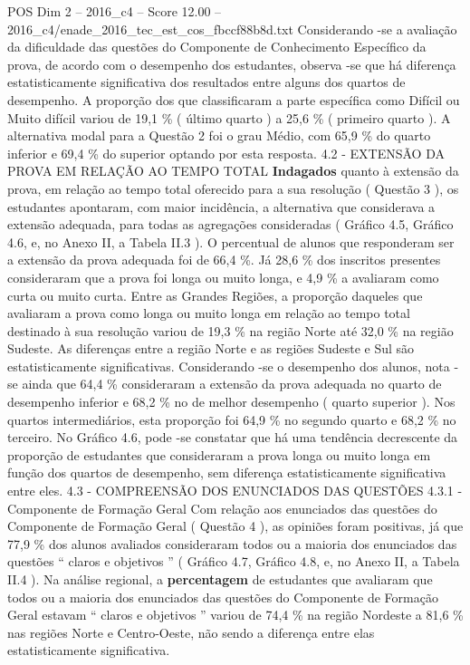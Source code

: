 \begin{textsample}{POS Dim 2 – 2016\_c4 – Score 12.00 – 2016\_c4/enade\_2016\_tec\_est\_cos\_fbccf88b8d.txt}
Considerando -se a avaliação da dificuldade das questões do Componente de Conhecimento Específico da prova, de acordo com o desempenho dos estudantes, observa -se que há diferença estatisticamente significativa dos resultados entre alguns dos quartos de desempenho.
A proporção dos que classificaram a parte específica como Difícil ou Muito difícil variou de 19,1 \% ( último quarto ) a 25,6 \% ( primeiro quarto ).
A alternativa modal para a Questão 2 foi o grau Médio, com 65,9 \% do quarto inferior e 69,4 \% do superior optando por esta resposta. 4.2 - EXTENSÃO DA PROVA EM RELAÇÃO AO TEMPO TOTAL \textbf{Indagados} quanto à extensão da prova, em relação ao tempo total oferecido para a sua resolução ( Questão 3 ), os estudantes apontaram, com maior incidência, a alternativa que considerava a extensão adequada, para todas as agregações consideradas ( Gráfico 4.5, Gráfico 4.6, e, no Anexo II, a Tabela II.3 ).
O percentual de alunos que responderam ser a extensão da prova adequada foi de 66,4 \%.
Já 28,6 \% dos inscritos presentes consideraram que a prova foi longa ou muito longa, e 4,9 \% a avaliaram como curta ou muito curta.
Entre as Grandes Regiões, a proporção daqueles que avaliaram a prova como longa ou muito longa em relação ao tempo total destinado à sua resolução variou de 19,3 \% na região Norte até 32,0 \% na região Sudeste.
As diferenças entre a região Norte e as regiões Sudeste e Sul são estatisticamente significativas.
Considerando -se o desempenho dos alunos, nota -se ainda que 64,4 \% consideraram a extensão da prova adequada no quarto de desempenho inferior e 68,2 \% no de melhor desempenho ( quarto superior ).
Nos quartos intermediários, esta proporção foi 64,9 \% no segundo quarto e 68,2 \% no terceiro.
No Gráfico 4.6, pode -se constatar que há uma tendência decrescente da proporção de estudantes que consideraram a prova longa ou muito longa em função dos quartos de desempenho, sem diferença estatisticamente significativa entre eles. 4.3 - COMPREENSÃO DOS ENUNCIADOS DAS QUESTÕES 4.3.1 - Componente de Formação Geral Com relação aos enunciados das questões do Componente de Formação Geral ( Questão 4 ), as opiniões foram positivas, já que 77,9 \% dos alunos avaliados consideraram todos ou a maioria dos enunciados das questões “ claros e objetivos ” ( Gráfico 4.7, Gráfico 4.8, e, no Anexo II, a Tabela II.4 ).
Na análise regional, a \textbf{percentagem} de estudantes que avaliaram que todos ou a maioria dos enunciados das questões do Componente de Formação Geral estavam “ claros e objetivos ” variou de 74,4 \% na região Nordeste a 81,6 \% nas regiões Norte e Centro-Oeste, não sendo a diferença entre elas estatisticamente significativa.

\end{textsample}
